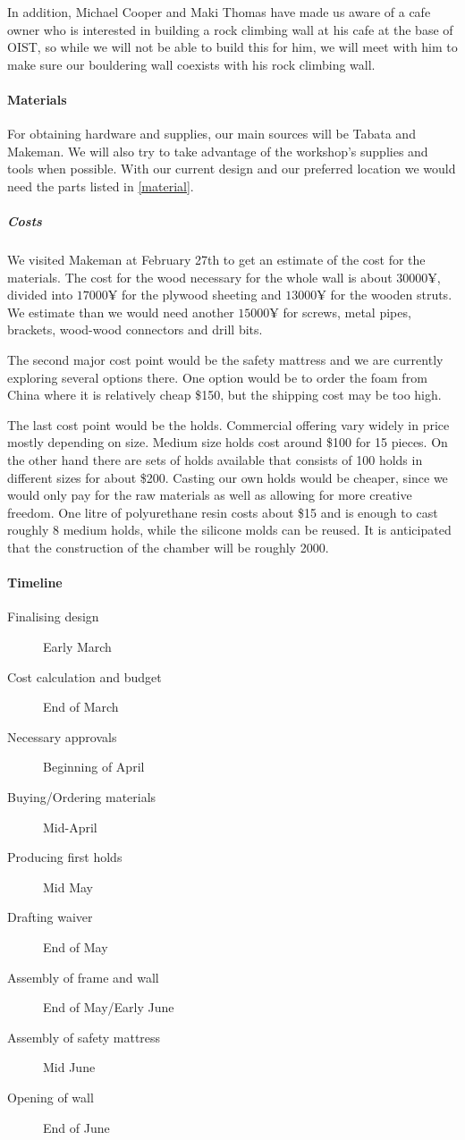 \documentclass[a4paper, 12pt]{scrreprt}
\begin{document}
In addition, Michael Cooper and Maki Thomas have made us aware of a cafe owner who is interested in building a rock climbing wall at his cafe at the base of OIST, so while we will not be able to build this for him, we will meet with him to make sure our bouldering wall coexists with his rock climbing wall.

\paragraph{Materials}
For obtaining hardware and supplies, our main sources will be Tabata and Makeman. We will also try to take advantage of the workshop's supplies and tools when possible. With our current design and our preferred location we would need the parts listed in \cref{material}.

\subparagraph{Costs}
We visited Makeman at February 27th to get an estimate of the cost for the materials. The cost for the wood necessary for the whole wall is about $30000\yen$, divided into $17000\yen$ for the plywood sheeting and $13000\yen$ for the wooden struts. We estimate than we would need another $15000\yen$ for screws, metal pipes, brackets, wood-wood connectors and drill bits.

The second major cost point would be the safety mattress and we are currently exploring several options there. One option would be to order the foam from China where it is relatively cheap \$150, but the shipping cost may be too high. 

The last cost point would be the holds. Commercial offering vary widely in price mostly depending on size. Medium size holds cost around \$100 for 15 pieces. On the other hand there are sets of holds available that consists of 100 holds in different sizes for about \$200. Casting our own holds would be cheaper, since we would only pay for the raw materials as well as allowing for more creative freedom. One litre of polyurethane resin costs about \$15 and is enough to cast roughly 8 medium holds, while the silicone molds can be reused. It is anticipated that the construction of the chamber will be roughly 2000\yen. 

\paragraph{Timeline}
\begin{description}
  \item[Finalising design] Early March
  \item[Cost calculation and budget] End of March
  \item[Necessary approvals] Beginning of April
  \item[Buying/Ordering materials] Mid-April
  \item[Producing first holds] Mid May
  \item[Drafting waiver] End of May
  \item[Assembly of frame and wall] End of May/Early June
  \item[Assembly of safety mattress] Mid June
  \item[Opening of wall] End of June
\end{description}
\end{document}
